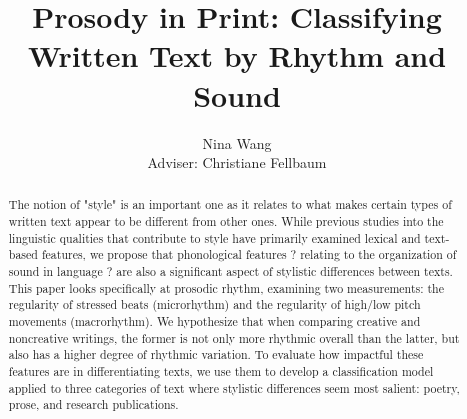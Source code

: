 \documentclass[pageno]{jpaper}
\begin{document}
\title{
Prosody in Print: Classifying Written Text by Rhythm and Sound}

\author{Nina Wang\\Adviser: Christiane Fellbaum}

\date{}
\maketitle

\thispagestyle{empty}
\doublespacing
\begin{abstract}
The notion of "style" is an important one as it relates to what makes certain types of written text appear to be different from other ones. While previous studies into the linguistic qualities that contribute to style have primarily examined lexical and text-based features, we propose that phonological features ? relating to the organization of sound in language ? are also a significant aspect of stylistic differences between texts. This paper looks specifically at prosodic rhythm, examining two measurements: the regularity of stressed beats (microrhythm) and the regularity of high/low pitch movements (macrorhythm). We hypothesize that when comparing creative and noncreative writings, the former is not only more rhythmic overall than the latter, but also has a higher degree of rhythmic variation. To evaluate how impactful these features are in differentiating texts, we use them to develop a classification model applied to three categories of text where stylistic differences seem most salient: poetry, prose, and research publications.
\end{abstract}
\end{document}
